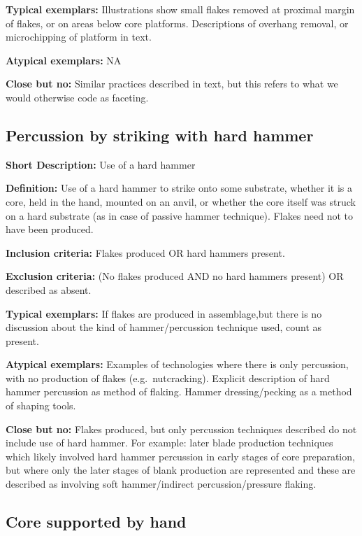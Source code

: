 \documentclass[
]{article}
\begin{document}
\textbf{Typical exemplars:} Illustrations show small flakes removed at
proximal margin of flakes, or on areas below core platforms.
Descriptions of overhang removal, or microchipping of platform in text.

\textbf{Atypical exemplars:} NA

\textbf{Close but no:} Similar practices described in text, but this
refers to what we would otherwise code as faceting.

\hypertarget{percussion-by-striking-with-hard-hammer}{%
\subsection{Percussion by striking with hard
hammer}\label{percussion-by-striking-with-hard-hammer}}

\textbf{Short Description:} Use of a hard hammer

\textbf{Definition:} Use of a hard hammer to strike onto some substrate,
whether it is a core, held in the hand, mounted on an anvil, or whether
the core itself was struck on a hard substrate (as in case of passive
hammer technique). Flakes need not to have been produced.

\textbf{Inclusion criteria:} Flakes produced OR hard hammers present.

\textbf{Exclusion criteria:} (No flakes produced AND no hard hammers
present) OR described as absent.

\textbf{Typical exemplars:} If flakes are produced in assemblage,but
there is no discussion about the kind of hammer/percussion technique
used, count as present.

\textbf{Atypical exemplars:} Examples of technologies where there is
only percussion, with no production of flakes (e.g.~nutcracking).
Explicit description of hard hammer percussion as method of flaking.
Hammer dressing/pecking as a method of shaping tools.

\textbf{Close but no:} Flakes produced, but only percussion techniques
described do not include use of hard hammer. For example: later blade
production techniques which likely involved hard hammer percussion in
early stages of core preparation, but where only the later stages of
blank production are represented and these are described as involving
soft hammer/indirect percussion/pressure flaking.

\hypertarget{core-supported-by-hand}{%
\subsection{Core supported by hand}\label{core-supported-by-hand}}
\end{document}

